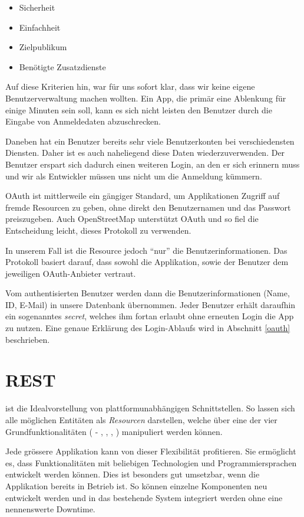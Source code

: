 \begin{itemize}
\item Sicherheit
\item Einfachheit
\item Zielpublikum
\item Benötigte Zusatzdienste
\end{itemize}

Auf diese Kriterien hin, war für uns sofort klar, dass wir keine eigene Benutzerverwaltung machen wollten.
Ein App, die primär eine Ablenkung für einige Minuten sein soll, kann es sich nicht leisten den Benutzer durch die Eingabe von Anmeldedaten abzuschrecken.

Daneben hat ein Benutzer bereits sehr viele Benutzerkonten bei verschiedensten Diensten.
Daher ist es auch naheliegend diese Daten wiederzuverwenden.
Der Benutzer erspart sich dadurch einen weiteren Login, an den er sich erinnern muss und wir als Entwickler müssen uns nicht um die Anmeldung kümmern.

\Gls{OAuth} ist mittlerweile ein gängiger Standard, um Applikationen Zugriff auf fremde Resourcen zu geben, ohne direkt den Benutzernamen und das Passwort preiszugeben.
Auch \gls{OpenStreetMap} unterstützt \gls{OAuth} und so fiel die Entscheidung leicht, dieses Protokoll zu verwenden.

In unserem Fall ist die Resource jedoch "`nur"' die Benutzerinformationen.
Das Protokoll basiert darauf, dass sowohl die Applikation, sowie der Benutzer dem jeweiligen \gls{OAuth}-Anbieter vertraut.

Vom authentisierten Benutzer werden dann die Benutzerinformationen (Name, ID, E-Mail) in unsere Datenbank übernommen.
Jeder Benutzer erhält daraufhin ein sogenanntes \emph{secret}, welches ihm fortan erlaubt ohne erneuten Login die App zu nutzen.
Eine genaue Erklärung des Login-Ablaufs wird in Abschnitt \ref{oauth} beschrieben.

\section{REST}
 ist die Idealvorstellung von plattformunabhängigen Schnittstellen.
So lassen sich alle möglichen Entitäten als \emph{Resourcen} darstellen, welche über eine der vier Grundfunktionalitäten ( - , , , ) manipuliert werden können.

Jede grössere Applikation kann von dieser Flexibilität profitieren.
Sie ermöglicht es, dass Funktionalitäten mit beliebigen Technologien und Programmiersprachen entwickelt werden können.
Dies ist besonders gut umsetzbar, wenn die Applikation bereits in Betrieb ist.
So können einzelne Komponenten neu entwickelt werden und in das bestehende System integriert werden ohne eine nennenswerte Downtime.

